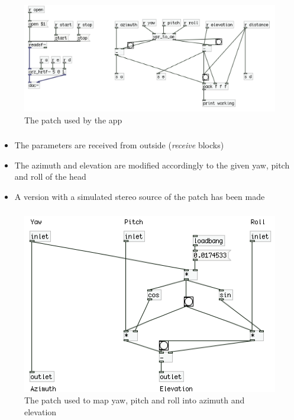 \documentclass{beamer}
\begin{document}
	\begin{frame}
		\frametitle{\insertsection}
		\begin{figure}
			\centering
			  \includegraphics[width=1.0\textwidth]{images/iOS_patch.png}
			  \caption{The patch used by the app}
			  \label{fig:ios_pd}
		\end{figure}
	\end{frame}

	\begin{frame}
		\frametitle{\insertsection}
		\begin{itemize}
			\item The parameters are received from outside ({\em receive} blocks)
			\item The azimuth and elevation are modified accordingly to
				the given yaw, pitch and roll of the head
			\item A version with a simulated stereo source of the patch has been made
		\end{itemize}
	\end{frame}

	\begin{frame}
		\frametitle{\insertsection}
		\begin{figure}
			\centering
			\includegraphics[width=1.0\textheight]{images/iOS_patch_conversion.png}
			\caption{The patch used to map yaw, pitch and roll \newline into azimuth and elevation}
		\end{figure}
	\end{frame}
\end{document}
